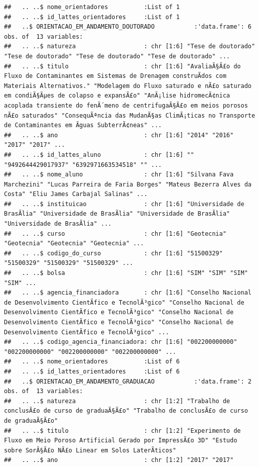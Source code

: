 \documentclass[]{article}
\begin{document}
\begin{verbatim}
##   .. ..$ nome_orientadores          :List of 1
##   .. ..$ id_lattes_orientadores     :List of 1
##   ..$ ORIENTACAO_EM_ANDAMENTO_DOUTORADO           :'data.frame': 6 obs. of  13 variables:
##   .. ..$ natureza                   : chr [1:6] "Tese de doutorado" "Tese de doutorado" "Tese de doutorado" "Tese de doutorado" ...
##   .. ..$ titulo                     : chr [1:6] "AvaliaÃ§Ã£o do Fluxo de Contaminantes em Sistemas de Drenagem construÃ­dos com Materiais Alternativos." "Modelagem do Fluxo saturado e nÃ£o saturado em condiÃ§Ãµes de colapso e expansÃ£o" "AnÃ¡lise hidromecÃ¢nica acoplada transiente do fenÃ´meno de centrifugaÃ§Ã£o em meios porosos nÃ£o saturados" "ConsequÃªncia das MudanÃ§as ClimÃ¡ticas no Transporte de Contaminantes em Ãguas SubterrÃ¢neas" ...
##   .. ..$ ano                        : chr [1:6] "2014" "2016" "2017" "2017" ...
##   .. ..$ id_lattes_aluno            : chr [1:6] "" "9492644429017937" "6392971663534518" "" ...
##   .. ..$ nome_aluno                 : chr [1:6] "Silvana Fava Marchezini" "Lucas Parreira de Faria Borges" "Mateus Bezerra Alves da Costa" "Eliu James Carbajal Salinas" ...
##   .. ..$ instituicao                : chr [1:6] "Universidade de BrasÃ­lia" "Universidade de BrasÃ­lia" "Universidade de BrasÃ­lia" "Universidade de BrasÃ­lia" ...
##   .. ..$ curso                      : chr [1:6] "Geotecnia" "Geotecnia" "Geotecnia" "Geotecnia" ...
##   .. ..$ codigo_do_curso            : chr [1:6] "51500329" "51500329" "51500329" "51500329" ...
##   .. ..$ bolsa                      : chr [1:6] "SIM" "SIM" "SIM" "SIM" ...
##   .. ..$ agencia_financiadora       : chr [1:6] "Conselho Nacional de Desenvolvimento CientÃ­fico e TecnolÃ³gico" "Conselho Nacional de Desenvolvimento CientÃ­fico e TecnolÃ³gico" "Conselho Nacional de Desenvolvimento CientÃ­fico e TecnolÃ³gico" "Conselho Nacional de Desenvolvimento CientÃ­fico e TecnolÃ³gico" ...
##   .. ..$ codigo_agencia_financiadora: chr [1:6] "002200000000" "002200000000" "002200000000" "002200000000" ...
##   .. ..$ nome_orientadores          :List of 6
##   .. ..$ id_lattes_orientadores     :List of 6
##   ..$ ORIENTACAO_EM_ANDAMENTO_GRADUACAO           :'data.frame': 2 obs. of  13 variables:
##   .. ..$ natureza                   : chr [1:2] "Trabalho de conclusÃ£o de curso de graduaÃ§Ã£o" "Trabalho de conclusÃ£o de curso de graduaÃ§Ã£o"
##   .. ..$ titulo                     : chr [1:2] "Experimento de Fluxo em Meio Poroso Artificial Gerado por ImpressÃ£o 3D" "Estudo sobre SorÃ§Ã£o NÃ£o Linear em Solos LaterÃ­ticos"
##   .. ..$ ano                        : chr [1:2] "2017" "2017"

\end{verbatim}
\end{document}
